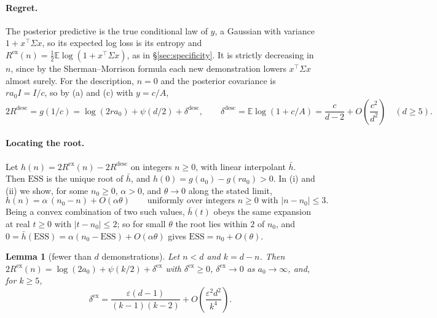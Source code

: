 \documentclass[10pt]{article}
\newtheorem{lemma}{Lemma}[section]
\newcommand{\ess}{\mathrm{ESS}}
\newcommand{\E}{\mathbb{E}}
\begin{document}
\paragraph{Regret.}
The posterior predictive is the true conditional law of $y$, a Gaussian with variance $1 + x^\top \Sigma x$, so its expected log loss is its entropy and $R^{\mathrm{ex}}(n) = \tfrac12 \E \log(1 + x^\top \Sigma x)$, as in \S\ref{sec:specificity}. It is strictly decreasing in $n$, since by the Sherman--Morrison formula each new demonstration lowers $x^\top \Sigma x$ almost surely. For the description, $n = 0$ and the posterior covariance is $r a_0 I = I/c$, so by (a) and (c) with $y = c/A$,
\begin{equation}\label{eq:rdesc}
2R^{\mathrm{desc}} = g(1/c) = \log(2 r a_0) + \psi(d/2) + \delta^{\mathrm{desc}},
\qquad
\delta^{\mathrm{desc}} = \E \log(1 + c/A) = \frac{c}{d-2} + O\!\left(\frac{c^2}{d^2}\right) \quad (d \ge 5).
\end{equation}

\paragraph{Locating the root.}
Let $h(n) = 2R^{\mathrm{ex}}(n) - 2R^{\mathrm{desc}}$ on integers $n \ge 0$, with linear interpolant $\bar h$. Then $\ess$ is the unique root of $\bar h$, and $h(0) = g(a_0) - g(r a_0) > 0$. In (i) and (ii) we show, for some $n_0 \ge 0$, $\alpha > 0$, and $\theta \to 0$ along the stated limit,
\begin{equation}\label{eq:root}
h(n) = \alpha\,(n_0 - n) + O(\alpha\theta)
\qquad \text{uniformly over integers $n \ge 0$ with $|n - n_0| \le 3$.}
\end{equation}
Being a convex combination of two such values, $\bar h(t)$ obeys the same expansion at real $t \ge 0$ with $|t - n_0| \le 2$; so for small $\theta$ the root lies within $2$ of $n_0$, and $0 = \bar h(\ess) = \alpha(n_0 - \ess) + O(\alpha\theta)$ gives $\ess = n_0 + O(\theta)$.

\begin{lemma}[fewer than $d$ demonstrations]\label{lem:few}
Let $n < d$ and $k = d - n$. Then $2R^{\mathrm{ex}}(n) = \log(2a_0) + \psi(k/2) + \delta^{\mathrm{ex}}$ with $\delta^{\mathrm{ex}} \ge 0$, $\delta^{\mathrm{ex}} \to 0$ as $a_0 \to \infty$, and, for $k \ge 5$,
\[
\delta^{\mathrm{ex}} = \frac{\varepsilon (d-1)}{(k-1)(k-2)} + O\!\left(\frac{\varepsilon^2 d^2}{k^4}\right).
\]
\end{lemma}
\end{document}
